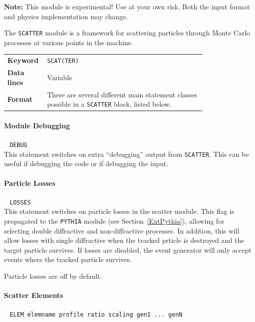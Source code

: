 \textcolor{notered}{\textbf{Note:} This module is experimental! Use at your own risk.
Both the input format and physics implementation may change.}

\bigskip
The \texttt{SCATTER} module is a framework for scattering particles through Monte Carlo processes at various points in the machine.

\bigskip
\begin{tabular}{@{}lp{0.8\linewidth}}
    \textbf{Keyword}    & \texttt{SCAT(TER)}\index{SCAT} \\
    \textbf{Data lines} & Variable \\
    \textbf{Format}     & There are several different main statement classes possible in a \texttt{SCATTER} block, listed below.
\end{tabular}

\bigskip

\paragraph{Module Debugging}~ \texttt{DEBUG}\\

This statement switches on extra ``debugging'' output from \texttt{SCATTER}.
This can be useful if debugging the code or if debugging the input.

\paragraph{Particle Losses}~ \texttt{LOSSES}\\

This statement switches on particle losses in the scatter module.
This flag is propagated to the \texttt{PYTHIA} module (see Section~\ref{ExtPythia}), allowing for selecting double diffractive and non-diffractive processes.
In addition, this will allow losses with single diffractive when the tracked prticle is destroyed and the target particle survives.
If losses are disabled, the event generator will only accept events where the tracked particle survives.

Particle losses are off by default.

\paragraph{Scatter Elements}~ \texttt{ELEM elemname profile ratio scaling gen1 ... genN}\\

